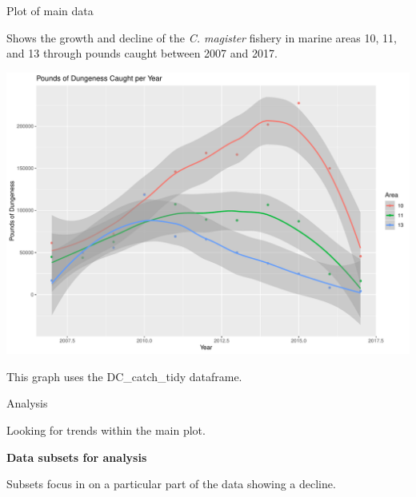 \documentclass[ignorenonframetext,]{beamer}
\newenvironment{Shaded}{\begin{snugshade}}{\end{snugshade}}
\newcommand{\KeywordTok}[1]{\textcolor[rgb]{0.13,0.29,0.53}{\textbf{#1}}}
\newcommand{\DecValTok}[1]{\textcolor[rgb]{0.00,0.00,0.81}{#1}}
\newcommand{\StringTok}[1]{\textcolor[rgb]{0.31,0.60,0.02}{#1}}
\newcommand{\OperatorTok}[1]{\textcolor[rgb]{0.81,0.36,0.00}{\textbf{#1}}}
\newcommand{\NormalTok}[1]{#1}
\begin{document}
\begin{frame}{Plot of main data}

Shows the growth and decline of the \emph{C. magister} fishery in marine
areas 10, 11, and 13 through pounds caught between 2007 and 2017.

\includegraphics{Claudia-dungeness_files/figure-beamer/main plot-1.pdf}

This graph uses the DC\_catch\_tidy dataframe.

\end{frame}

\begin{frame}[fragile]{Analysis}

Looking for trends within the main plot.

\textbf{Data subsets for analysis}

\begin{Shaded}
\end{Shaded}

Subsets focus in on a particular part of the data showing a decline.

\end{frame}
\end{document}
